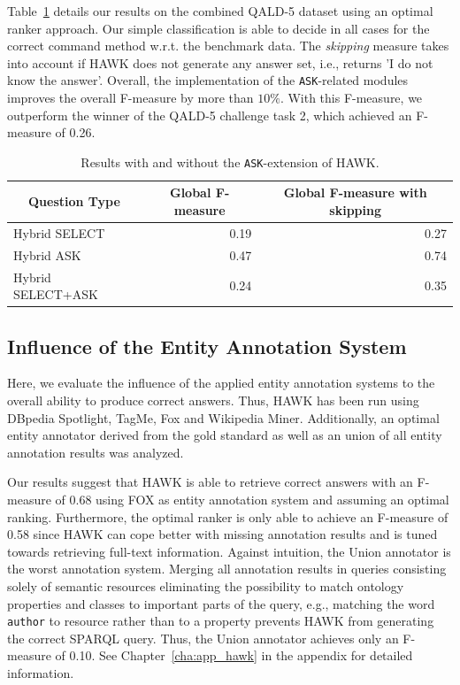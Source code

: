 Table~\ref{tab:eval_ask} details our results on the combined \ac{QALD}-5 dataset using an optimal ranker approach. 
Our simple classification is able to decide in all cases for the correct command method w.r.t. the benchmark data.
The \emph{skipping} measure takes into account if HAWK does not generate any answer set, i.e., returns 'I do not know the answer'.
Overall, the implementation of the \texttt{ASK}-related modules improves the overall F-measure by more than $10\%$. With this F-measure, we outperform the winner of the \ac{QALD}-5 challenge task 2, which achieved an F-measure of 0.26. 


\begin{table}[htb!]
\centering
\begin{tabular}{@{}lrr@{}}
\toprule
\multicolumn{1}{c}{{\bf Question Type}} & \multicolumn{1}{c}{{\bf Global F-measure}} & \multicolumn{1}{c}{{\bf Global F-measure with skipping}} \\ \midrule
Hybrid SELECT                           & 0.19                                       & 0.27                                                     \\
Hybrid ASK                              & 0.47                                       & 0.74                                                     \\
Hybrid SELECT+ASK                       & 0.24                                       & 0.35                                                     \\ \bottomrule
\end{tabular}
\caption{Results with and without the \texttt{ASK}-extension of HAWK.}
\label{tab:eval_ask}
\end{table}


\subsection{Influence of the Entity Annotation System}
Here, we evaluate the influence of the applied entity annotation systems to the overall ability to produce correct answers.
Thus, HAWK has been run using DBpedia Spotlight, TagMe, Fox and Wikipedia Miner. %
Additionally, an optimal entity annotator derived from the gold standard as well as an union of all entity annotation results was analyzed. 

Our results suggest that HAWK is able to retrieve correct answers with an F-measure of 0.68 using FOX as entity annotation system and assuming an optimal ranking.
Furthermore, the optimal ranker is only able to achieve an F-measure of 0.58 since HAWK can cope better with missing annotation results and is tuned towards retrieving full-text information.
Against intuition, the Union annotator is the worst annotation system. 
Merging all annotation results in queries consisting solely of semantic resources eliminating the possibility to match ontology properties and classes to important parts of the query, e.g., matching the word \texttt{author} to resource rather than to a property prevents HAWK from generating the correct SPARQL query.
Thus, the Union annotator achieves only an F-measure of 0.10.
See Chapter~\ref{cha:app_hawk} in the appendix for detailed information.

